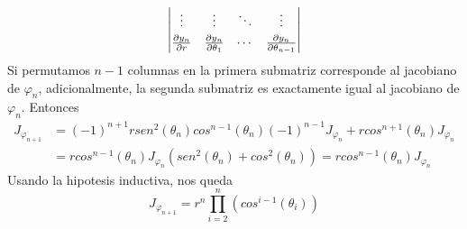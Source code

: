 \documentclass{article}
\begin{document}
\begin{enumerate}
\begin{equation*}
\begin{vmatrix}
            \vdots & \vdots & \ddots & \vdots \\[1mm]
            \frac{\partial y_{n}}{\partial r} & \frac{\partial y_{n}}{\partial\theta_{1}} & \cdots & \frac{\partial y_{n}}{\partial\theta_{n-1}}
        \end{vmatrix}
    \end{equation*}
    Si permutamos $n-1$ columnas en la primera submatriz corresponde al jacobiano de $\varphi_{n}$,
    adicionalmente, la segunda submatriz es exactamente igual al jacobiano de $\varphi_{n}$. 
    Entonces
    \begin{align*}
        J_{\varphi_{n+1}} &= (-1)^{n+1}rsen^{2}(\theta_{n})cos^{n-1}(\theta_{n})(-1)^{n-1}
        J_{\varphi_{n}}+rcos^{n+1}(\theta_{n})J_{\varphi_{n}} \\[2mm]
        &= rcos^{n-1}(\theta_{n})J_{\varphi_{n}}(sen^{2}(\theta_{n})+cos^{2}(\theta_{n}))
        =rcos^{n-1}(\theta_{n})J_{\varphi_{n}}
    \end{align*}
    Usando la hipotesis inductiva, nos queda
    \begin{equation*}
        J_{\varphi_{n+1}}=r^{n}\prod_{i=2}^{n}(cos^{i-1}(\theta_{i}))
    \end{equation*}
    

\end{enumerate}
\end{document}
